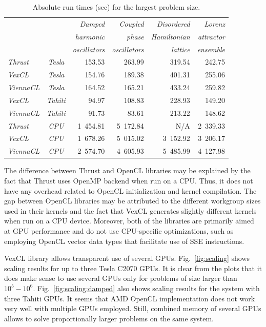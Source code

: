 \documentclass[1p]{elsarticle}
\newcommand{\figref}[1]{Fig.~\ref{#1}}
\begin{document}
\begin{table}
    \begin{center}
    \begin{tabular}{|lc|rrrr|}
	\hline
	& & \em Damped	    & \em Coupled	& \em Disordered    & \em Lorenz    \\
	& & \em harmonic    & \em phase		& \em Hamiltonian   & \em attractor \\
	& & \em oscillators & \em oscillators	& \em lattice	    & \em ensemble  \\
	\hline
	\em Thrust   &\em Tesla & 153.53 & 263.99 & 319.54 & 242.75 \\
	\em VexCL    &\em Tesla & 154.76 & 189.38 & 401.31 & 255.06 \\
	\em ViennaCL &\em Tesla & 164.52 & 165.21 & 433.24 & 259.82 \\
	\hline
	\em VexCL    &\em Tahiti &  94.97 & 108.83 & 228.93 & 149.20 \\
	\em ViennaCL &\em Tahiti &  91.73 &  83.61 & 213.22 & 148.62 \\
	\hline
	\em Thrust   &\em CPU	& 1~454.81 & 5~172.84 &      N/A & 2~339.33 \\
	\em VexCL    &\em CPU	& 1~678.26 & 5~015.02 & 3~152.92 & 3~206.17 \\
	\em ViennaCL &\em CPU	& 2~574.70 & 4~605.93 & 5~485.99 & 4~127.98 \\
	\hline
    \end{tabular}
    \caption{Absolute run times (sec) for the largest problem size.}
    \label{tab:abstimes}
    \end{center}
\end{table}


The difference between Thrust and OpenCL libraries may be explained by the fact
that Thrust uses OpenMP backend when run on a CPU. Thus, it does not have any
overhead related to OpenCL initialization and kernel compilation.  The gap
between OpenCL libraries may be attributed to the different workgroup sizes
used in their kernels and the fact that VexCL generates slightly different
kernels when run on a CPU device. Moreover, both of the libraries are primarily
aimed at GPU performance and do not use CPU-specific optimizations, such as
employing OpenCL vector data types that facilitate use of SSE instructions.

VexCL library allows transparent use of several GPUs. \figref{fig:scaling}
shows scaling results for up to three Tesla C2070 GPUs. It is clear from the
plots that it does make sense to use several GPUs only for problems of size
larger than $10^5-10^6$. \figref{fig:scaling:damped} also shows
scaling results for the system with three Tahiti GPUs. It seems that AMD OpenCL
implementation does not work very well with multiple GPUs employed. Still,
combined memory of several GPUs allows to solve proportionally larger problems
on the same system.
\end{document}

